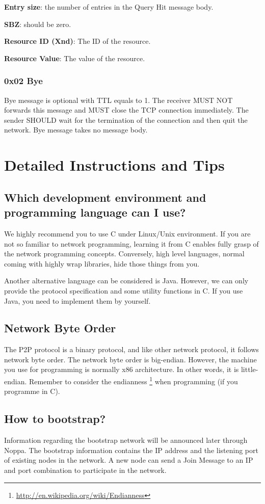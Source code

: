 \documentclass[12pt, a4paper]{article}
\begin{document}
\textbf{Entry size}: the number of entries in the Query Hit message body.

\textbf{SBZ}: should be zero.

\textbf{Resource ID (Xnd)}: The ID of the resource.

\textbf{Resource Value}: The value of the resource.

\subsubsection{0x02 Bye}
Bye message is optional with TTL equals to 1.
The receiver MUST NOT forwards this message and MUST close the TCP connection immediately.
The sender SHOULD wait for the termination of the connection and then quit the network.
Bye message takes no message body.



\section{Detailed Instructions and Tips}

\subsection*{Which development environment and programming language can I use?}
We highly recommend you to use C under Linux/Unix environment.
If you are not so familiar to network programming, learning it from C enables fully grasp of the network programming concepts.
Conversely, high level languages, normal coming with highly wrap libraries, hide those things from you.

Another alternative language can be considered is Java.
However, we can only provide the protocol specification and some utility functions in C.
If you use Java, you need to implement them by yourself.

\subsection*{Network Byte Order}
The P2P protocol is a binary protocol, and like other network protocol, it follows network byte order.
The network byte order is big-endian.
However, the machine you use for programming is normally x86 architecture.
In other words, it is little-endian.
Remember to consider the endianness \footnote{\url{http://en.wikipedia.org/wiki/Endianness}} when programming (if you programme in C).

\subsection*{How to bootstrap?}
Information regarding the bootstrap network will be announced later through Noppa.
The bootstrap information contains the IP address and the listening port of existing nodes in the network.
A new node can send a Join Message to an IP and port combination to participate in the network.
\end{document}
